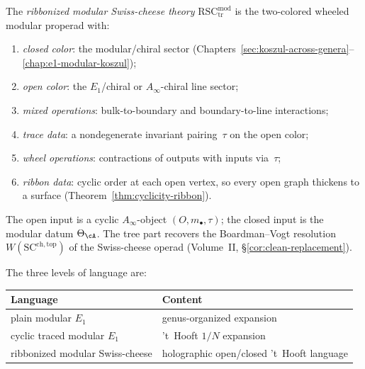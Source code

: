 \begin{definition}%
\label{def:ribbonized-swiss-cheese}%
%
%
The \emph{ribbonized modular Swiss-cheese theory}
$\mathrm{RSC}_{\mathrm{tr}}^{\mathrm{mod}}$
is the two-colored wheeled modular properad with\textup:
\begin{enumerate}[label=\textup{(\roman*)}]
\item \emph{closed color}: the modular/chiral sector
 \textup{(}Chapters~\textup{\ref{sec:koszul-across-genera}--\ref{chap:e1-modular-koszul}}\textup{)}\textup;
\item \emph{open color}: the $E_1$/chiral or
 $A_\infty$-chiral line sector\textup;
\item \emph{mixed operations}: bulk-to-boundary and
 boundary-to-line interactions\textup;
\item \emph{trace data}: a nondegenerate invariant
 pairing~$\tau$ on the open color\textup;
\item \emph{wheel operations}: contractions of
 outputs with inputs via~$\tau$\textup;
\item \emph{ribbon data}: cyclic order at each open
 vertex, so every open graph thickens to a surface
 \textup{(}Theorem~\textup{\ref{thm:cyclicity-ribbon}}\textup{)}.
\end{enumerate}
The open input is a cyclic $A_\infty$-object
$(O, m_\bullet, \tau)$\textup; the closed input is
the modular datum $\Theta_\cA$.
The tree part recovers the Boardman--Vogt resolution
$W(\mathrm{SC}^{\mathrm{ch,top}})$ of the Swiss-cheese
operad \textup{(}Volume~II, \S\ref{cor:clean-replacement}\textup{)}.
\end{definition}

\begin{remark}%
\label{rem:correct-holographic-language}%
%
The three levels of language are\textup:
\begin{center}
\small
\renewcommand{\arraystretch}{1.3}
\begin{tabular}{ll}
\toprule
\textbf{Language} & \textbf{Content} \\
\midrule
plain modular $E_1$
 & genus-organized expansion \\
cyclic traced modular $E_1$
 & 't~Hooft $1/N$ expansion \\
ribbonized modular Swiss-cheese
 & holographic open/closed 't~Hooft language \\
\bottomrule
\end{tabular}
\end{center}
\end{remark}

